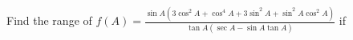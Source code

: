 Find the range of $ f(A)=\frac{\sin A(3\cos^{2}A+\cos^{4}A+3\sin^{2}A+\sin^{2}A\cos^{2}A)}{\tan A (\sec A-\sin A\tan A)} $ if 